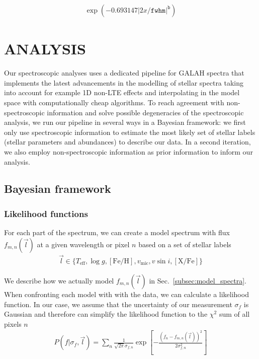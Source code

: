 \documentclass[
  journal=pasa,
  manuscript=research-paper, %
  year=2021,
  volume=37,
]{cup-journal}
\begin{document}
\begin{align}
    \exp \left(-0.693147 \vert 2x/\texttt{fwhm}\vert^\texttt{b}\right) \label{eq:lsf}
\end{align}

\section{ANALYSIS}

Our spectroscopic analyses uses a dedicated pipeline for GALAH spectra that implements the latest advancements in the modelling of stellar spectra taking into account for example 1D non-LTE effects and interpolating in the model space with computationally cheap algorithms. To reach agreement with non-spectroscopic information and solve possible degeneracies of the spectroscopic analysis, we run our pipeline in several ways in a Bayesian framework: we first only use spectroscopic information to estimate the most likely set of stellar labels (stellar parameters and abundances) to describe our data. In a second iteration, we also employ non-spectroscopic information as prior information to inform our analysis.

\subsection{Bayesian framework}

\subsubsection{Likelihood functions}

For each part of the spectrum, we can create a model spectrum with flux $f_{m,n} (\vec{l})$ at a given wavelength or pixel $n$ based on a set of stellar labels 
\begin{align}
    \vec{l} \in \{ T_\text{eff}, \log g, \mathrm{[Fe/H]}, v_\mathrm{mic}, v \sin i, \mathrm{[X/Fe]}
    \}
\end{align}

We describe how we actually model $f_{m,n} (\vec{l})$ in Sec.~\ref{subsec:model_spectra}. When confronting each model with with the data, we can calculate a likelihood function. In our case, we assume that the uncertainty of our measurement $\sigma_f$ is Gaussian and therefore can simplify the likelihood function to the $\chi^2$ sum of all pixels $n$
\begin{align}
    P ( f \vert \sigma_{f}, \vec{l} ) = \sum_n \frac{1}{\sqrt{2 \pi} \sigma_{f,n}} \exp \left[ - \frac{\left( f_n - f_{m,n} (\vec{l} ) \right)^2}{2\sigma_{f,n}^2} \right]
\end{align}
\end{document}
